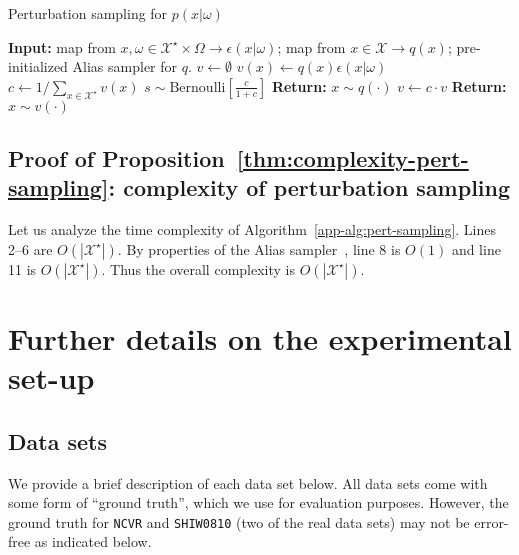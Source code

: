 \documentclass[12pt,letterpaper]{article}
\newcommand{\1}[1]{\mathbb{I}\!\left[#1\right]} %
\begin{document}
\begin{algorithm}[H]
  \caption{Perturbation sampling for $p(x|\omega)$}
  \label{app-alg:pert-sampling}
  \begin{algorithmic}[1]
    \Statex \textbf{Input:} 
    map from $x, \omega \in \mathcal{X}^\star \times \Omega \to 
    \epsilon(x|\omega)$; 
    map from $x \in \mathcal{X} \to q(x)$; 
    pre-initialized Alias sampler for $q$.
    \State $v \gets \emptyset$ 
    \State $v(x) \gets q(x) \epsilon(x|\omega)$
    \EndFor
    \State $c \gets 1/\sum_{x \in \mathcal{X}^\star} v(x)$ 
    \State $s \sim \mathrm{Bernoulli}\!\left[\frac{c}{1+c}\right]$
    \State \textbf{Return:} $x \sim q(\cdot)$ 
    \Else 
    \State $v \gets c \cdot v$
    \State \textbf{Return:} $x \sim v(\cdot)$
    \EndIf
  \end{algorithmic}
\end{algorithm}

\subsection{Proof of Proposition~\ref{thm:complexity-pert-sampling}: 
complexity of perturbation sampling}
Let us analyze the time complexity of Algorithm~\ref{app-alg:pert-sampling}.
Lines 2--6 are $O(|\mathcal{X}^\star|)$.
By properties of the Alias sampler~\citep{vose_linear_1991},
line 8 is $O(1)$ and line 11 is $O(|\mathcal{X}^\star|)$.
Thus the overall complexity is $O(|\mathcal{X}^\star|)$.

\section{Further details on the experimental set-up}
\label{app-sec:experiments-setup}
\subsection{Data sets}
We provide a brief description of each data set below. 
All data sets come with some form of ``ground truth'', which we 
use for evaluation purposes. 
However, the ground truth for \texttt{NCVR} and \texttt{SHIW0810} (two 
of the real data sets) may not be error-free as indicated below.
\end{document}
